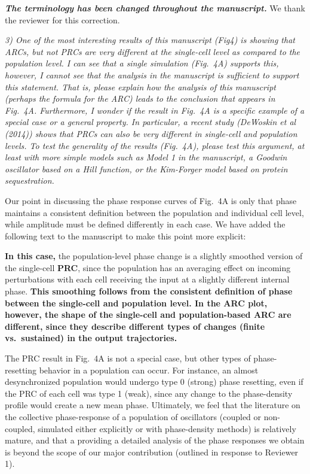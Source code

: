 \documentclass[11pt, letterpaper]{article}
\newenvironment{reviewer}{\itshape\color{gray}}{}
\newenvironment{manuscript}[1]{\begin{center}\begin{tcolorbox}[colback=green!5!white,colframe=green!75!black,width=0.8\textwidth,title={#1},breakable,fonttitle=\bfseries]}{\end{tcolorbox}\end{center}}
\begin{document}
{\bfseries\itshape The terminology has been changed throughout the manuscript.}
We thank the reviewer for this correction.

\begin{reviewer}
3) One of the most interesting results of this manuscript (Fig4) is showing that ARCs, but not PRCs are very different at the single-cell level as compared to the population level.
I can see that a single simulation (Fig.~4A) supports this, however, I cannot see that the analysis in the manuscript is sufficient to support this statement.
That is, please explain how the analysis of this manuscript (perhaps the formula for the ARC) leads to the conclusion that appears in Fig.~4A.
Furthermore, I wonder if the result in Fig.~4A is a specific example of a special case or a general property.
In particular, a recent study (DeWoskin et al (2014)) shows that PRCs can also be very different in single-cell and population levels.
To test the generality of the results (Fig.~4A), please test this argument, at least with more simple models such as Model 1 in the manuscript, a Goodwin oscillator based on a Hill function, or the Kim-Forger model based on protein sequestration.
\end{reviewer}
 
Our point in discussing the phase response curves of Fig.~4A is only that phase maintains a consistent definition between the population and individual cell level, while amplitude must be defined differently in each case.
We have added the following text to the manuscript to make this point more explicit:

\begin{manuscript}{Page 14}
  {\bfseries In this case,} the population-level phase change is a slightly smoothed version of the single-cell {\bfseries PRC}, since the population has an averaging effect on incoming perturbations with each cell receiving the input at a slightly different internal phase.
{\bfseries This smoothing follows from the consistent definition of phase between the single-cell and population level.
In the ARC plot, however, the shape of the single-cell and population-based ARC are different, since they describe different types of changes (finite vs.\ sustained) in the output trajectories.}
\end{manuscript}

The PRC result in Fig.~4A is not a special case, but other types of phase-resetting behavior in a population can occur.
For instance, an almost desynchronized population would undergo type 0 (strong) phase resetting, even if the PRC of each cell was type 1 (weak), since any change to the phase-density profile would create a new mean phase.
Ultimately, we feel that the literature on the collective phase-response of a population of oscillators (coupled or non-coupled, simulated either explicitly or with phase-density methods) is relatively mature, and that a providing a detailed analysis of the phase responses we obtain is beyond the scope of our major contribution (outlined in response to Reviewer 1).
 
\end{document}

